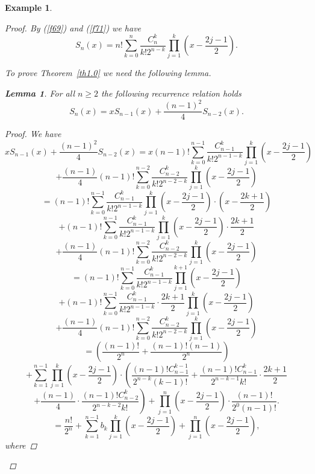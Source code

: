 \documentclass[12pt]{amsart}
\newcounter{count}
\numberwithin{count}{section}
\newtheorem{Lemma}[count]{Lemma}
\newtheorem{Example}[count]{Example}
\begin{document}
\begin{Example}
\begin{proof}
By (\ref{f69}) and  (\ref{f71}) we have
\begin{equation}
\label{f73}
S_n(x) =  n! \sum_{k=0}^n \frac{C_n^k }{k! 2^{n-k}} \prod_{j=1}^k \left(x- \frac{2j-1}{2}\right).
\end{equation}

To prove Theorem~\ref{th1.0} we need the following lemma.
\begin{Lemma}
\label{L1}
For all $n \geq 2$  the following recurrence relation holds
\begin{equation}
\label{f74}
S_n(x) =  x S_{n-1}(x) + \frac{(n-1)^2}{4} S_{n-2}(x).
\end{equation}
\end{Lemma}
\begin{proof}
We have
$$ x S_{n-1}(x) + \frac{(n-1)^2}{4} S_{n-2}(x) = x(n-1)! \sum_{k=0}^{n-1} \frac{C_{n-1}^k }{k! 2^{n-1-k}}
 \prod_{j=1}^k \left(x- \frac{2j-1}{2}\right) $$
$$  +\frac{(n-1)}{4} (n-1)!   \sum_{k=0}^{n-2} \frac{C_{n-2}^k }{k! 2^{n-2-k}}
 \prod_{j=1}^k \left(x- \frac{2j-1}{2}\right)  $$
$$=    (n-1)! \sum_{k=0}^{n-1} \frac{C_{n-1}^k }{k! 2^{n-1-k}}
 \prod_{j=1}^{k} \left(x- \frac{2j-1}{2}\right)\cdot \left(x- \frac{2k+1}{2}\right)  $$   
$$+  (n-1)! \sum_{k=0}^{n-1} \frac{C_{n-1}^k }{k! 2^{n-1-k}} 
 \prod_{j=1}^k \left(x- \frac{2j-1}{2}\right) \cdot \frac{2k+1}{2} $$
 $$ +\frac{(n-1)}{4} (n-1)!   \sum_{k=0}^{n-2} \frac{C_{n-2}^k }{k! 2^{n-2-k}}
 \prod_{j=1}^k \left(x- \frac{2j-1}{2}\right)  $$
 $$=    (n-1)! \sum_{k=0}^{n-1} \frac{C_{n-1}^k }{k! 2^{n-1-k}}
 \prod_{j=1}^{k+1} \left(x- \frac{2j-1}{2}\right) $$   
$$+  (n-1)! \sum_{k=0}^{n-1} \frac{C_{n-1}^k }{k! 2^{n-1-k}} \cdot \frac{2k+1}{2} 
 \prod_{j=1}^k \left(x- \frac{2j-1}{2}\right) $$
 $$ +\frac{(n-1)}{4} (n-1)!   \sum_{k=0}^{n-2} \frac{C_{n-2}^k }{k! 2^{n-2-k}}
 \prod_{j=1}^k \left(x- \frac{2j-1}{2}\right)  $$
$$ = \left(\frac{(n-1)!}{2^n} +\frac{(n-1)!(n-1)}{2^n}  \right)  $$
$$+  \sum_{k=1}^{n-1} 
\prod_{j=1}^k \left(x- \frac{2j-1}{2}\right) \cdot \left(\frac{(n-1)! C_{n-1}^{k-1}}{2^{n-k} (k-1)!} + 
\frac{(n-1)! C_{n-1}^{k}}{2^{n-k-1} k!}\cdot \frac{2k+1}{2} \right.$$
$$\left.  +\frac{(n-1)}{4} \cdot 
\frac{(n-1)! C_{n-2}^k}{2^{n-k-2} k!} \right)  + \prod_{j=1}^n \left(x- \frac{2j-1}{2}\right)\cdot 
\frac{(n-1)!}{2^0 (n-1)!}. $$
\begin{equation}
\label{f75}
=\frac{n!}{2^n}+ \sum_{k=1}^{n-1}  b_k
\prod_{j=1}^k \left(x- \frac{2j-1}{2}\right) +  \prod_{j=1}^n \left(x- \frac{2j-1}{2}\right),
\end{equation}
where

\end{proof}
\end{proof}
\end{Example}
\end{document}
